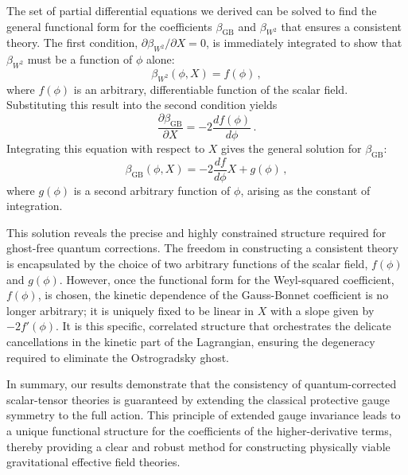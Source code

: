 \documentclass[twocolumn]{aastex631}
\begin{document}
The set of partial differential equations we derived can be solved to find the general functional form for the coefficients $\beta_{\text{GB}}$ and $\beta_{W^2}$ that ensures a consistent theory.
The first condition, $\partial\beta_{W^2}/\partial X = 0$, is immediately integrated to show that $\beta_{W^2}$ must be a function of $\phi$ alone:
\begin{equation}
    \beta_{W^2}(\phi, X) = f(\phi) \,,
\end{equation}
where $f(\phi)$ is an arbitrary, differentiable function of the scalar field. Substituting this result into the second condition yields
\begin{equation}
    \frac{\partial\beta_{\text{GB}}}{\partial X} = -2 \frac{df(\phi)}{d\phi} \,.
\end{equation}
Integrating this equation with respect to $X$ gives the general solution for $\beta_{\text{GB}}$:
\begin{equation}
    \beta_{\text{GB}}(\phi, X) = -2 \frac{df}{d\phi} X + g(\phi) \,,
\end{equation}
where $g(\phi)$ is a second arbitrary function of $\phi$, arising as the constant of integration.

This solution reveals the precise and highly constrained structure required for ghost-free quantum corrections. The freedom in constructing a consistent theory is encapsulated by the choice of two arbitrary functions of the scalar field, $f(\phi)$ and $g(\phi)$. However, once the functional form for the Weyl-squared coefficient, $f(\phi)$, is chosen, the kinetic dependence of the Gauss-Bonnet coefficient is no longer arbitrary; it is uniquely fixed to be linear in $X$ with a slope given by $-2f'(\phi)$. It is this specific, correlated structure that orchestrates the delicate cancellations in the kinetic part of the Lagrangian, ensuring the degeneracy required to eliminate the Ostrogradsky ghost.

In summary, our results demonstrate that the consistency of quantum-corrected scalar-tensor theories is guaranteed by extending the classical protective gauge symmetry to the full action. This principle of extended gauge invariance leads to a unique functional structure for the coefficients of the higher-derivative terms, thereby providing a clear and robust method for constructing physically viable gravitational effective field theories.
\end{document}
